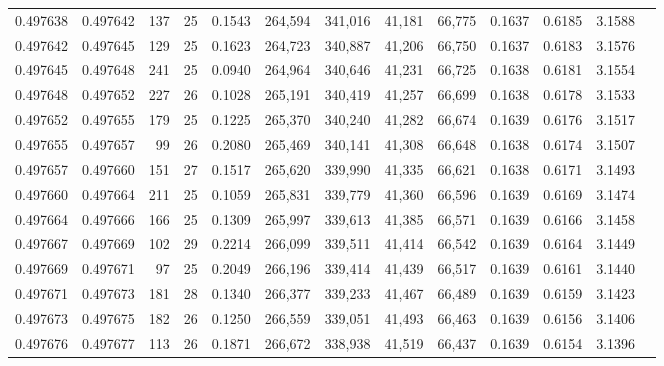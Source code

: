 \begin{tabular}{rrrrrrrrrrrrr}
0.497638 & 0.497642 & 137 &  25 &                                     0.1543 & 264,594 & 341,016 &  41,181 &  66,775 & 0.1637 & 0.6185 & 3.1588 \\
0.497642 & 0.497645 & 129 &  25 &                                     0.1623 & 264,723 & 340,887 &  41,206 &  66,750 & 0.1637 & 0.6183 & 3.1576 \\
0.497645 & 0.497648 & 241 &  25 &                                     0.0940 & 264,964 & 340,646 &  41,231 &  66,725 & 0.1638 & 0.6181 & 3.1554 \\
0.497648 & 0.497652 & 227 &  26 &                                     0.1028 & 265,191 & 340,419 &  41,257 &  66,699 & 0.1638 & 0.6178 & 3.1533 \\
0.497652 & 0.497655 & 179 &  25 &                                     0.1225 & 265,370 & 340,240 &  41,282 &  66,674 & 0.1639 & 0.6176 & 3.1517 \\
0.497655 & 0.497657 &  99 &  26 &                                     0.2080 & 265,469 & 340,141 &  41,308 &  66,648 & 0.1638 & 0.6174 & 3.1507 \\
0.497657 & 0.497660 & 151 &  27 &                                     0.1517 & 265,620 & 339,990 &  41,335 &  66,621 & 0.1638 & 0.6171 & 3.1493 \\
0.497660 & 0.497664 & 211 &  25 &                                     0.1059 & 265,831 & 339,779 &  41,360 &  66,596 & 0.1639 & 0.6169 & 3.1474 \\
0.497664 & 0.497666 & 166 &  25 &                                     0.1309 & 265,997 & 339,613 &  41,385 &  66,571 & 0.1639 & 0.6166 & 3.1458 \\
0.497667 & 0.497669 & 102 &  29 &                                     0.2214 & 266,099 & 339,511 &  41,414 &  66,542 & 0.1639 & 0.6164 & 3.1449 \\
0.497669 & 0.497671 &  97 &  25 &                                     0.2049 & 266,196 & 339,414 &  41,439 &  66,517 & 0.1639 & 0.6161 & 3.1440 \\
0.497671 & 0.497673 & 181 &  28 &                                     0.1340 & 266,377 & 339,233 &  41,467 &  66,489 & 0.1639 & 0.6159 & 3.1423 \\
0.497673 & 0.497675 & 182 &  26 &                                     0.1250 & 266,559 & 339,051 &  41,493 &  66,463 & 0.1639 & 0.6156 & 3.1406 \\
0.497676 & 0.497677 & 113 &  26 &                                     0.1871 & 266,672 & 338,938 &  41,519 &  66,437 & 0.1639 & 0.6154 & 3.1396 \\

\end{tabular}
